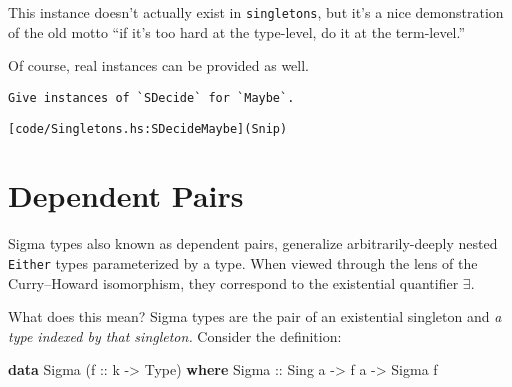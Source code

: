 \documentclass[
  11pt,
]{book}
\newenvironment{Shaded}{}{}
\newcommand{\DataTypeTok}[1]{\textcolor[rgb]{0.56,0.13,0.00}{#1}}
\newcommand{\FunctionTok}[1]{\textcolor[rgb]{0.02,0.16,0.49}{#1}}
\newcommand{\KeywordTok}[1]{\textcolor[rgb]{0.00,0.44,0.13}{\textbf{#1}}}
\newcommand{\NormalTok}[1]{#1}
\newcommand{\OperatorTok}[1]{\textcolor[rgb]{0.40,0.40,0.40}{#1}}
\newcommand{\OtherTok}[1]{\textcolor[rgb]{0.00,0.44,0.13}{#1}}
\theoremstyle{nonumberplain}
\begin{document}
This instance doesn't actually exist in \texttt{singletons}, but it's a
nice demonstration of the old motto ``if it's too hard at the
type-level, do it at the term-level.''

Of course, real instances can be provided as well.

\begin{Shaded}
\end{Shaded}

\begin{verbatim}
Give instances of `SDecide` for `Maybe`.
\end{verbatim}

\begin{verbatim}
[code/Singletons.hs:SDecideMaybe](Snip)
\end{verbatim}

\hypertarget{dependent-pairs}{%
\section{Dependent Pairs}\label{dependent-pairs}}

Sigma types also known as dependent pairs, generalize arbitrarily-deeply
nested \texttt{Either} types parameterized by a type. When viewed
through the lens of the Curry--Howard isomorphism, they correspond to
the existential quantifier \(\exists\).

What does this mean? Sigma types are the pair of an existential
singleton and \emph{a type indexed by that singleton.} Consider the
definition:

\begin{Shaded}
\begin{Highlighting}[]
\KeywordTok{data} \DataTypeTok{Sigma}\NormalTok{ (}\OtherTok{f ::}\NormalTok{ k }\OtherTok{{-}\textgreater{}} \DataTypeTok{Type}\NormalTok{) }\KeywordTok{where}
  \DataTypeTok{Sigma}\OtherTok{ ::} \DataTypeTok{Sing}\NormalTok{ a }\OtherTok{{-}\textgreater{}}\NormalTok{ f a }\OtherTok{{-}\textgreater{}} \DataTypeTok{Sigma}\NormalTok{ f}
\end{Highlighting}
\end{Shaded}
\end{document}
